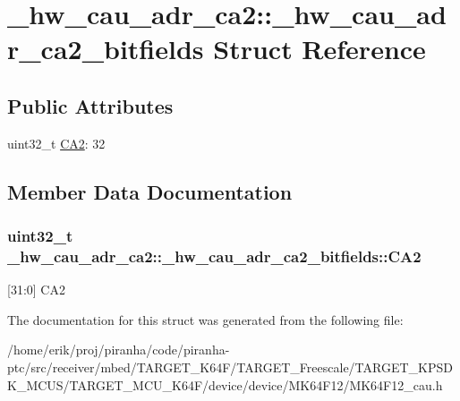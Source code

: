 \hypertarget{struct__hw__cau__adr__ca2_1_1__hw__cau__adr__ca2__bitfields}{}\section{\+\_\+hw\+\_\+cau\+\_\+adr\+\_\+ca2\+:\+:\+\_\+hw\+\_\+cau\+\_\+adr\+\_\+ca2\+\_\+bitfields Struct Reference}
\label{struct__hw__cau__adr__ca2_1_1__hw__cau__adr__ca2__bitfields}
\subsection*{Public Attributes}
\begin{DoxyCompactItemize}
\item 
uint32\+\_\+t \hyperlink{struct__hw__cau__adr__ca2_1_1__hw__cau__adr__ca2__bitfields_aa25e39b5d450c11e516fca11a63b3c43}{C\+A2}\+: 32
\end{DoxyCompactItemize}


\subsection{Member Data Documentation}
\subsubsection[{\texorpdfstring{C\+A2}{CA2}}]{\setlength{\rightskip}{0pt plus 5cm}uint32\+\_\+t \+\_\+hw\+\_\+cau\+\_\+adr\+\_\+ca2\+::\+\_\+hw\+\_\+cau\+\_\+adr\+\_\+ca2\+\_\+bitfields\+::\+C\+A2}\hypertarget{struct__hw__cau__adr__ca2_1_1__hw__cau__adr__ca2__bitfields_aa25e39b5d450c11e516fca11a63b3c43}{}\label{struct__hw__cau__adr__ca2_1_1__hw__cau__adr__ca2__bitfields_aa25e39b5d450c11e516fca11a63b3c43}
\mbox{[}31\+:0\mbox{]} C\+A2 

The documentation for this struct was generated from the following file\+:\begin{DoxyCompactItemize}
\item 
/home/erik/proj/piranha/code/piranha-\/ptc/src/receiver/mbed/\+T\+A\+R\+G\+E\+T\+\_\+\+K64\+F/\+T\+A\+R\+G\+E\+T\+\_\+\+Freescale/\+T\+A\+R\+G\+E\+T\+\_\+\+K\+P\+S\+D\+K\+\_\+\+M\+C\+U\+S/\+T\+A\+R\+G\+E\+T\+\_\+\+M\+C\+U\+\_\+\+K64\+F/device/device/\+M\+K64\+F12/M\+K64\+F12\+\_\+cau.\+h\end{DoxyCompactItemize}
